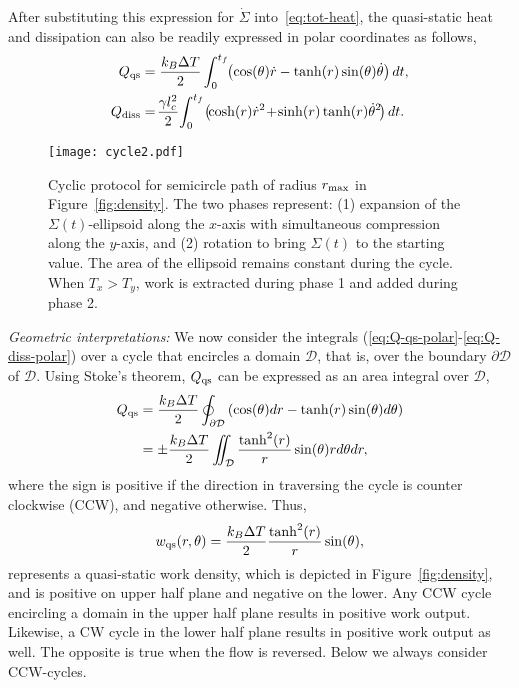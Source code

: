 \documentclass[
 reprint,
superscriptaddress,
 amsmath,amssymb,prl
 aps
]{revtex4-2}
\begin{document}
After substituting this expression for $\dot{\Sigma}$ into~\eqref{eq:tot-heat}, the quasi-static heat and dissipation can also be readily expressed in polar coordinates as follows,
\begin{subequations}
\begin{align}\label{eq:Q-qs-polar}
     {Q}_{\rm qs} &=\frac{k_B\Delta T}{2}\int_0^{t_f}\hspace*{-3pt} \left(\cos(\theta) \dot{r}-   \tanh(r) \sin(\theta)\dot{\theta} \right)dt,\\\label{eq:Q-diss-polar}
    {Q}_{\rm diss} &=\!\frac{\gamma { l_c^2}}{2}\! \int_0^{t_f} \! \left(\! \cosh(r)\dot{r}^2 \!+\! \sinh(r) \tanh(r) \dot{\theta}^2\!\right) dt.
\end{align}
\end{subequations} 

\begin{figure}[t]
    \centering
        \texttt{[image: cycle2.pdf]}
        \caption{Cyclic protocol for semicircle path of radius $r_{\rm max}$ in Figure~\ref{fig:density}. The two phases represent: (1) expansion of the $\Sigma(t)$-ellipsoid along the $x$-axis with simultaneous compression along the $y$-axis, and (2) rotation to bring $\Sigma(t)$ to the starting value. The area of the ellipsoid remains constant during the cycle. When $T_x>T_y$, work is extracted during phase 1 and added during phase 2.}
        \label{fig:cycle}
\end{figure}

{\em Geometric interpretations:}
We now consider the integrals (\ref{eq:Q-qs-polar}-\ref{eq:Q-diss-polar}) over a cycle that encircles a domain $\mathcal D$, that is, over the boundary $\partial \mathcal D$ of $\mathcal D$. Using Stoke's theorem, $Q_{\rm qs}$ can be expressed as an area integral over $\mathcal D$,
\begin{align}\nonumber
    Q_{\rm qs} &=\frac{k_B\Delta T}{2} \oint_{\partial \mathcal D} \left(\cos(\theta)dr  - \tanh(r)\sin(\theta) d \theta \right) \\\label{eq:Qqscompute}
    &=  \pm \frac{k_B\Delta T}{2} \iint_{\mathcal D} \frac{\tanh^2(r)}{r}\sin(\theta) rd\theta d r,
\end{align}
where the sign is positive if the direction in traversing the cycle is counter clockwise (CCW), and negative otherwise. 
Thus,
\begin{equation}
    \label{eq:w-qs}
w_{\rm qs}(r,\theta)=\frac{k_B\Delta T}{2}\frac{\tanh^2(r)}{r}\sin(\theta),
\end{equation}
represents a quasi-static work density, which is depicted in Figure~\ref{fig:density}, and is positive on upper half plane and negative on the lower.  Any CCW cycle encircling a domain in the upper half plane results in positive work output. Likewise, a CW cycle in the lower half plane results in positive work output as well. The opposite is true when the flow is reversed. Below we always consider CCW-cycles.
\end{document}
